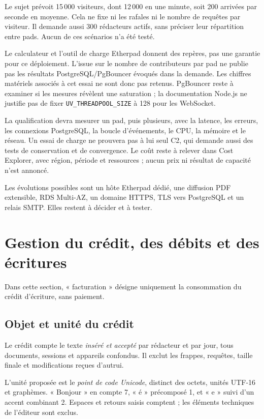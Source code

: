 Le sujet prévoit 15\,000 visiteurs, dont 12\,000 en une minute, soit 200 arrivées par seconde en moyenne. Cela ne fixe ni les rafales ni le nombre de requêtes par visiteur. Il demande aussi 300 rédacteurs actifs, sans préciser leur répartition entre pads. Aucun de ces scénarios n'a été testé.

Le calculateur et l'outil de charge Etherpad donnent des repères, pas une garantie pour ce déploiement. L'issue sur le nombre de contributeurs par pad ne publie pas les résultats PostgreSQL/PgBouncer évoqués dans la demande. Les chiffres matériels associés à cet essai ne sont donc pas retenus. PgBouncer reste à examiner si les mesures révèlent une saturation ; la documentation Node.js ne justifie pas de fixer \texttt{UV\_THREADPOOL\_SIZE} à 128 pour les WebSocket. \cite{etherpad-scale,etherpad-loadtest,etherpad-7756,nodejs20-cli}

La qualification devra mesurer un pad, puis plusieurs, avec la latence, les erreurs, les connexions PostgreSQL, la boucle d'événements, le CPU, la mémoire et le réseau. Un essai de charge ne prouvera pas à lui seul C2, qui demande aussi des tests de conservation et de convergence. Le coût reste à relever dans Cost Explorer, avec région, période et ressources ; aucun prix ni résultat de capacité n'est annoncé. \cite{aws-cost-explorer}

Les évolutions possibles sont un hôte Etherpad dédié, une diffusion PDF extensible, RDS Multi-AZ, un domaine HTTPS, TLS vers PostgreSQL et un relais SMTP. Elles restent à décider et à tester.

\section{Gestion du crédit, des débits et des écritures}

Dans cette section, « facturation » désigne uniquement la consommation du crédit d'écriture, sans paiement.

\subsection{Objet et unité du crédit}

Le crédit compte le texte \emph{inséré et accepté} par rédacteur et par jour, tous documents, sessions et appareils confondus. Il exclut les frappes, requêtes, taille finale et modifications reçues d'autrui.

L'unité proposée est le \emph{point de code Unicode}, distinct des octets, unités UTF-16 et graphèmes. « Bonjour » en compte 7, « é » précomposé 1, et « e » suivi d'un accent combinant 2. Espaces et retours saisis comptent ; les éléments techniques de l'éditeur sont exclus.

